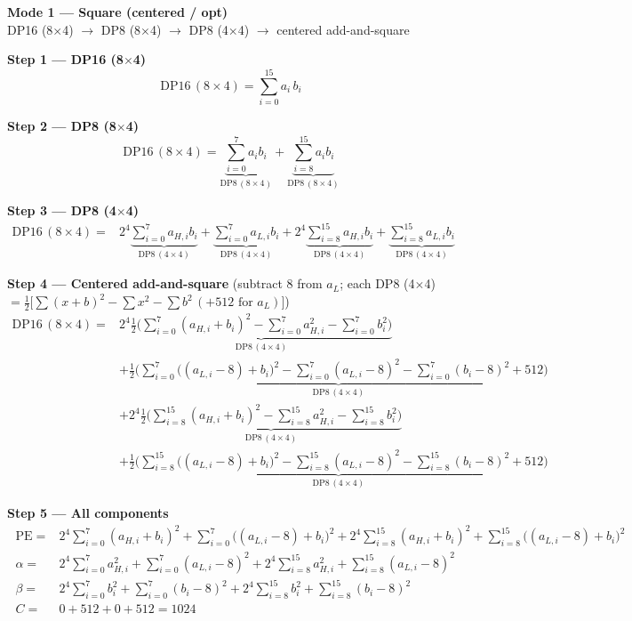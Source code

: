 \documentclass[fleqn]{article}
\newcommand{\DPop}[3]{\mathrm{DP#1}\,(#2\!\times\!#3)}
\begin{document}
\begin{center}
{\LARGE \textbf{Mode 1 --- Square (centered / opt)}}\\[4pt]
{\large DP16 (8$\times$4) $\rightarrow$ DP8 (8$\times$4) $\rightarrow$ DP8 (4$\times$4) $\rightarrow$ centered add-and-square}
\end{center}

\textbf{Step 1 --- DP16 (8$\times$4)}
\[ \DPop{16}{8}{4} = \sum_{i=0}^{15} a_i \, b_i \]

\textbf{Step 2 --- DP8 (8$\times$4)}
\[ \DPop{16}{8}{4} = \underbrace{\sum_{i=0}^{7} a_i b_i}_{\DPop{8}{8}{4}} + \underbrace{\sum_{i=8}^{15} a_i b_i}_{\DPop{8}{8}{4}} \]

\textbf{Step 3 --- DP8 (4$\times$4)}
\begin{align*}
\DPop{16}{8}{4} = {}
 & 2^{4}\underbrace{\sum_{i=0}^{7} a_{H,i} b_i}_{\DPop{8}{4}{4}} + \underbrace{\sum_{i=0}^{7} a_{L,i} b_i}_{\DPop{8}{4}{4}}
 + 2^{4}\underbrace{\sum_{i=8}^{15} a_{H,i} b_i}_{\DPop{8}{4}{4}} + \underbrace{\sum_{i=8}^{15} a_{L,i} b_i}_{\DPop{8}{4}{4}}
\end{align*}

\textbf{Step 4 --- Centered add-and-square}\quad
{\small(subtract $8$ from $a_L$; each DP8 (4$\times$4) $=\tfrac12\big[\sum(x{+}b)^2-\sum x^2-\sum b^2\,(+512\text{ for }a_L)\big]$)}
\begin{align*}
\DPop{16}{8}{4} = {}
  & 2^{4}\underbrace{\tfrac12\Big(\sum_{i=0}^{7}(a_{H,i}{+}b_i)^2 - \sum_{i=0}^{7}a_{H,i}^2 - \sum_{i=0}^{7}b_i^2\Big)}_{\DPop{8}{4}{4}} \\[0.6em]
  & + \underbrace{\tfrac12\Big(\sum_{i=0}^{7}\big((a_{L,i}{-}8){+}b_i\big)^2 - \sum_{i=0}^{7}(a_{L,i}{-}8)^2 - \sum_{i=0}^{7}(b_i{-}8)^2 + 512\Big)}_{\DPop{8}{4}{4}} \\[0.6em]
  & + 2^{4}\underbrace{\tfrac12\Big(\sum_{i=8}^{15}(a_{H,i}{+}b_i)^2 - \sum_{i=8}^{15}a_{H,i}^2 - \sum_{i=8}^{15}b_i^2\Big)}_{\DPop{8}{4}{4}} \\[0.6em]
  & + \underbrace{\tfrac12\Big(\sum_{i=8}^{15}\big((a_{L,i}{-}8){+}b_i\big)^2 - \sum_{i=8}^{15}(a_{L,i}{-}8)^2 - \sum_{i=8}^{15}(b_i{-}8)^2 + 512\Big)}_{\DPop{8}{4}{4}}
\end{align*}

\textbf{Step 5 --- All components}
\[
\boxed{\;
\begin{aligned}
\mathrm{PE} ={}& 2^{4}\!\sum_{i=0}^{7}(a_{H,i}{+}b_i)^2 + \sum_{i=0}^{7}\!\big((a_{L,i}{-}8){+}b_i\big)^2 + 2^{4}\!\sum_{i=8}^{15}(a_{H,i}{+}b_i)^2 + \sum_{i=8}^{15}\!\big((a_{L,i}{-}8){+}b_i\big)^2 \\[0.3em]
\alpha ={}& 2^{4}\!\sum_{i=0}^{7} a_{H,i}^2 + \sum_{i=0}^{7}(a_{L,i}{-}8)^2 + 2^{4}\!\sum_{i=8}^{15} a_{H,i}^2 + \sum_{i=8}^{15}(a_{L,i}{-}8)^2 \\[0.3em]
\beta ={}& 2^{4}\!\sum_{i=0}^{7} b_i^2 + \sum_{i=0}^{7}(b_i{-}8)^2 + 2^{4}\!\sum_{i=8}^{15} b_i^2 + \sum_{i=8}^{15}(b_i{-}8)^2 \\[0.3em]
C ={}& 0 + 512 + 0 + 512 = 1024
\end{aligned}
\;}
\]
\end{document}
